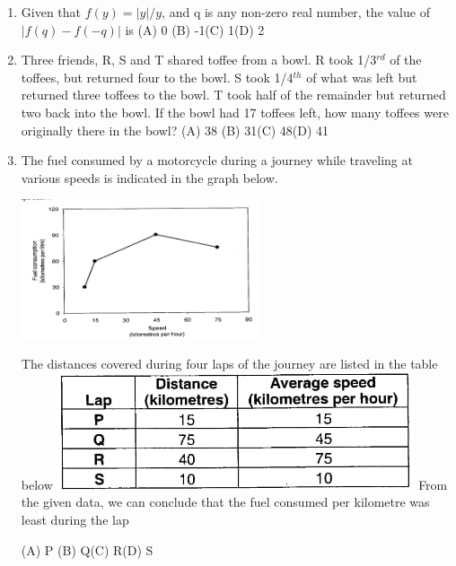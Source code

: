 \documentclass[journal]{IEEEtran}
\begin{document}
\begin{enumerate}
	\item{ 
Given that $f(y) =|y|/y$, and q is any non-zero real number, the value of $|f(q) - f(-q) |$ is
}
		\newline(A) 0 \hspace{10mm} (B) -1\hspace{10mm}(C) 1\hspace{10mm}(D) 2
	\item{ Three friends, R, S and T shared toffee from a bowl. R took 1/3$^{rd}$ of the toffees, but returned four to the bowl. S took 1/4$^{th}$ of what was left but returned three toffees to the bowl. T took half of the remainder but returned two back into the bowl. If the bowl had 17 toffees left, how many toffees were originally there in the bowl?}
	\newline(A) 38 \hspace{10mm} (B) 31\hspace{10mm}(C) 48\hspace{10mm}(D) 41
\item{ The fuel consumed by a motorcycle during a journey while traveling at various speeds is indicated in the graph below.
	\begin{center}
	\includegraphics[width=7cm]{1}
	\end{center}
The distances covered during four laps of the journey are listed in the table below
	\includegraphics[width=\textwidth]{2}
From the given data, we can conclude that the fuel consumed per kilometre was least during the lap} 

	
		(A) P \hspace{10mm} (B) Q\hspace{10mm}(C) R\hspace{10mm}(D) S
\end{enumerate}
\end{document}
